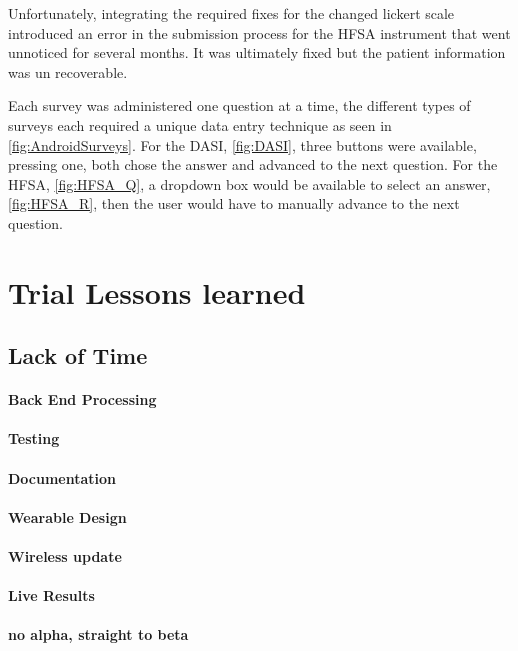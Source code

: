 Unfortunately, integrating the required fixes for the changed lickert scale introduced an error in the submission process for the HFSA instrument that went unnoticed for several months. It was ultimately fixed but the patient information was un recoverable.

Each survey was administered one question at a time, the different types of surveys each required a unique data entry technique as seen in \cref{fig:AndroidSurveys}. For the DASI, \cref{fig:DASI}, three buttons were available, pressing one, both chose the answer and advanced to the next question. For the HFSA, \cref{fig:HFSA_Q}, a dropdown box would be available to select an answer, \cref{fig:HFSA_R}, then the user would have to manually advance to the next question. 



\section{Trial Lessons learned}

\subsection{Lack of Time}
\paragraph{Back End Processing}
\paragraph{Testing}
\paragraph{Documentation}
\paragraph{Wearable Design}
\paragraph{Wireless update}
\paragraph{Live Results}
\paragraph{no alpha, straight to beta}


